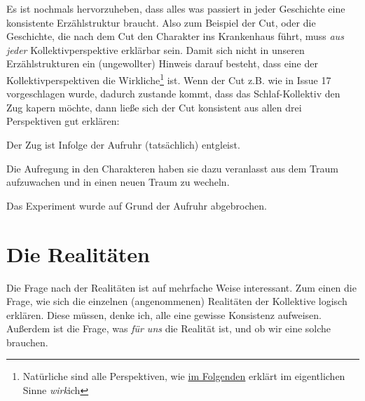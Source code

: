 \documentclass[12pt, a4paper, openany]{report}
\let\tempone\itemize
\let\temptwo\enditemize
\renewenvironment{itemize}{\tempone\addtolength{\itemsep}{-0.5\baselineskip}}{\temptwo}
\begin{document}
Es ist nochmals hervorzuheben, dass alles was passiert in jeder Geschichte eine konsistente Erzählstruktur braucht. 
Also zum Beispiel der Cut, oder die Geschichte, die nach dem Cut den Charakter ins Krankenhaus führt, muss \emph{aus jeder} Kollektivperspektive erklärbar sein.
Damit sich nicht in unseren Erzählstrukturen ein (ungewollter) Hinweis darauf besteht, dass eine der Kollektivperspektiven die Wirkliche\footnote{Natürliche sind alle Perspektiven, wie \hyperref[realitaeten]{im Folgenden} erklärt im eigentlichen Sinne \emph{wirk}ich} ist.
Wenn der Cut z.B. wie in Issue 17 vorgeschlagen wurde, dadurch zustande kommt, dass das Schlaf-Kollektiv den Zug kapern möchte, dann ließe sich der Cut konsistent aus allen drei Perspektiven gut erklären:
\begin{itemize}
    \item[Kollektiv 1:] Der Zug ist Infolge der Aufruhr (tatsächlich) entgleist.
    \item[Kollektiv 2:] Die Aufregung in den Charakteren haben sie dazu
      veranlasst aus dem Traum aufzuwachen und in einen neuen Traum zu wecheln.
    \item[Kollektiv 3:] Das Experiment wurde auf Grund der Aufruhr abgebrochen.
\end{itemize}

\section{Die Realitäten}\label{realitaeten}
Die Frage nach der Realitäten ist auf mehrfache Weise interessant. 
Zum einen die Frage, wie sich die einzelnen (angenommenen) Realitäten der Kollektive logisch erklären. 
Diese müssen, denke ich, alle eine gewisse Konsistenz aufweisen.
Außerdem ist die Frage, was \emph{für uns} die Realität ist, und ob wir eine solche brauchen.\\
\end{document}
